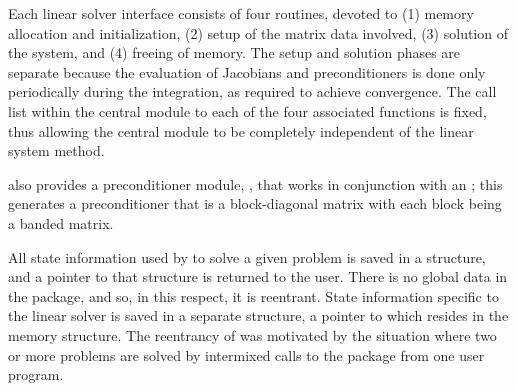 Each {\ida} linear solver interface consists of four routines, devoted to
(1) memory allocation and initialization, (2) setup of the matrix data
involved, (3) solution of the system, and (4) freeing of memory.  
The setup and solution phases are separate because the evaluation of
Jacobians and preconditioners is done only periodically during the
integration, as required to achieve convergence. The call list within
the central {\ida} module to each of the four associated functions is
fixed, thus allowing the central module to be completely independent
of the linear system method.

{\ida} also provides a preconditioner module, {\idabbdpre}, that works
in conjunction with {\nvecp} an  {\idaspils}; this generates a preconditioner that is a
block-diagonal matrix with each block being a banded matrix.

All state information used by {\ida} to solve a given problem is saved
in a structure, and a pointer to that structure is returned to the
user.  There is no global data in the {\ida} package, and so, in this
respect, it is reentrant. State information specific to the linear
solver is saved in a separate structure, a pointer to which resides in
the {\ida} memory structure. The reentrancy of {\ida} was motivated
by the situation where two or more problems are solved by
intermixed calls to the package from one user program.

